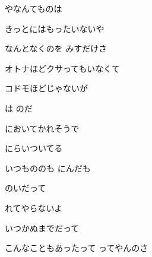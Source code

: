 \documentclass[a4paper,tate,twocolumn,12pt]{ltjtarticle}
\begin{document}
\begin{flushleft}
\begin{minipage}{\linewidth}
やなんてものは

きっとにはもったいないや

なんとなくのを みすだけさ
\end{minipage}

\vspace{2em}

\noindent\begin{minipage}{\linewidth}
オトナほどクサってもいなくて

コドモほどじゃないが

は のだ
\end{minipage}

\vspace{2em}

\noindent\begin{minipage}{\linewidth}
においてかれそうで

にらいついてる

いつもののも にんだも

のいだって

れてやらないよ

いつかぬまでだって

こんなこともあったって ってやんのさ
\end{minipage}

\end{flushleft}
\end{document}
